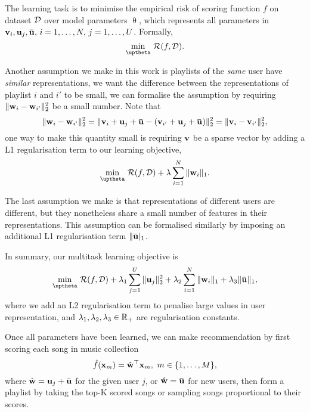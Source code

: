 %
The learning task is to minimise the empirical risk of scoring function $f$ on dataset $\mathcal{D}$ over model parameters $\uptheta$,
which represents all parameters in $\bv_i, \bu_j, \widebar\bu, \, i=1,\dots,N, \, j=1,\dots,U$.
Formally,
$$
\min_{\uptheta} \, \RCal(f, \DCal).
$$

Another assumption we make in this work is playlists of the \emph{same} user have \emph{similar} representations,
\ie we want the difference between the representations of playlist $i$ and $i'$ to be small,
we can formalise the assumption by requiring $\|\mathbf{w}_i - \mathbf{w}_{i'}\|_2^2$ be a small number. 
Note that
$$
\|\w_i - \w_{i'}\|_2^2 = \|\bv_i + \bu_j + \widebar\bu - (\bv_{i'} + \bu_j + \widebar\bu) \|_2^2 = \|\bv_i - \bv_{i'}\|_2^2,
$$
one way to make this quantity small is requiring $\mathbf{v}$ be a sparse vector by adding a L1 regularisation term 
to our learning objective, \ie
$$
\min_{\uptheta} \, \RCal(f, \DCal) + \lambda \sum_{i=1}^N \|\w_i\|_1.
$$

The last assumption we make is that representations of different users are different, 
but they nonetheless share a small number of features in their representations.
This assumption can be formalised similarly by imposing an additional L1 regularisation term $\|\widebar\bu|_1$.

In summary, our multitask learning objective is
\begin{equation}
\label{eq:obj}
\min_{\uptheta} \, \RCal(f, \DCal) 
   + \lambda_1 \sum_{j=1}^U \|\bu_j\|_2^2 + \lambda_2 \sum_{i=1}^N \|\w_i\|_1 + \lambda_3 \|\widebar\bu\|_1,
\end{equation}
where we add an L2 regularisation term to penalise large values in user representation,
and $\lambda_1, \lambda_2, \lambda_3 \in \mathbb{R}_+$ are regularisation constants.

Once all parameters have been learned, we can make recommendation by first scoring each song in music collection
$$
\hat f(\mathbf{x}_m) = \hat {\mathbf{w}}^\top \mathbf{x}_m, \ m \in \{1,\dots,M\},
$$
where $\hat\w = \bu_j + \widebar\bu$ for the given user $j$, or $\hat\w = \widebar\bu$ for new users,
then form a playlist by taking the top-K scored songs or sampling songs proportional to their scores. 
